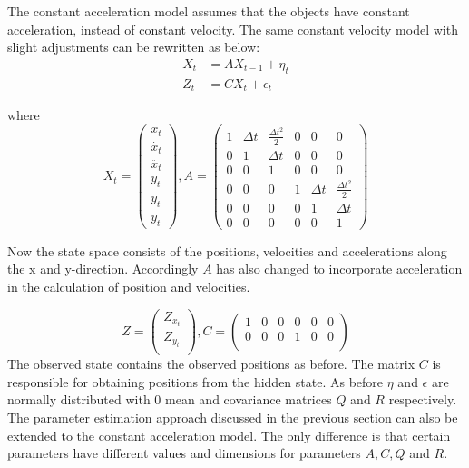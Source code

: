 \documentclass{article}
\begin{document}
The constant acceleration model assumes that the objects have constant acceleration, instead of constant velocity. The same constant velocity model with slight adjustments can be rewritten as below:
\begin{equation}
    \begin{split}
        X_{t}&=AX_{t-1} + \eta_t\\
        Z_{t}&=CX_{t}+\epsilon_t
    \end{split}
\end{equation}

where $$X_t=\begin{pmatrix}x_t 
\\ \dot{x_t} 
\\ \ddot{x_t} 
\\ y_t 
\\ \dot{y_t} 
\\ \ddot{y_t}
\end{pmatrix}, 
A=\begin{pmatrix}1 & \Delta t & \frac{\Delta t^2}{2} & 0 & 0 & 0 
\\ 0 & 1 & \Delta t & 0 & 0 & 0 
\\ 0 & 0 & 1 & 0 & 0 & 0
\\ 0 & 0 & 0 & 1 &\Delta t & \frac{\Delta t^2}{2}
\\ 0 & 0 & 0 & 0 & 1 &\Delta t 
\\ 0 & 0 & 0 & 0 & 0 & 1
\end{pmatrix}
$$

Now the state space consists of the positions, velocities and accelerations along the x and y-direction. Accordingly $A$ has also changed to incorporate acceleration in the calculation of position and velocities. 

$$
Z=\begin{pmatrix}
Z_{x_{t}}\\
Z_{y_{t}}\\
\end{pmatrix}, 
C=\begin{pmatrix} 1 & 0 & 0 & 0 & 0 & 0\\
0 & 0 & 0 & 1 & 0 & 0\\
\end{pmatrix}
$$ 
The observed state contains the observed positions as before. The matrix $C$ is responsible for obtaining positions from the hidden state. As before $\eta$ and $\epsilon$ are normally distributed with 0 mean and covariance matrices $Q$ and $R$ respectively. The parameter estimation approach discussed in the previous section can also be extended to the constant acceleration model. The only difference is that certain parameters have different values and dimensions for parameters $A,C,Q$ and $R$.
\end{document}
